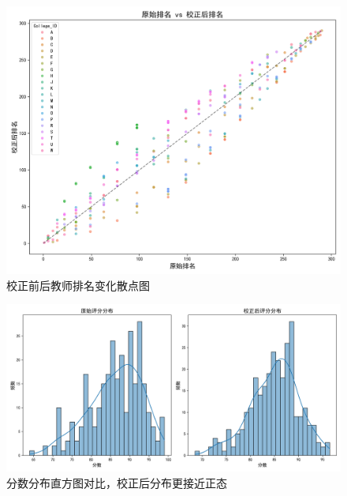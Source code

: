 \documentclass[withoutpreface,bwprint]{cumcmthesis}
\begin{document}
\begin{figure}[H]
\centering
\includegraphics[width=1\textwidth]{figures/Results_Visualization/rank_comparison_scatter.png}
\caption{校正前后教师排名变化散点图}
\label{fig:rank_comparison_scatter}
\end{figure}

\begin{figure}[H]
\centering
\includegraphics[width=1\textwidth]{figures/Results_Visualization/score_distributions_comparison.png}
\caption{分数分布直方图对比，校正后分布更接近正态}
\label{fig:score_distributions_comparison}
\end{figure}



\end{document}
